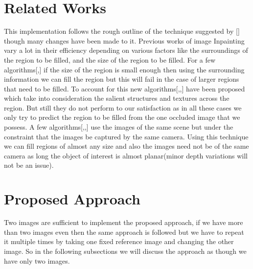 \documentclass[conference]{IEEEtran}
\begin{document}
\section{Related Works}	  
	This implementation follows the rough outline of the technique suggested by [\cite{whyte2009get}] though many changes have been made to it. Previous works of image Inpainting vary a lot in their efficiency depending on various factors like the surroundings of the region to be filled, and the size of the region to be filled. For a few algorithms[\cite{bertalmio2003simultaneous},\cite{efros1999texture}] if the size of the region is small enough then using the surrounding information we can fill the region but this will fail in the case of larger regions that need to be filled. To account for this new algorithms[\cite{bertalmio2003simultaneous},\cite{criminisi2003object},\cite{sun2005image}] have been proposed which take into consideration the salient structures and textures across the region. But still they do not perform to our satisfaction as in all these cases we only try to predict the region to be filled from the one occluded image that we possess. A few algorithms[\cite{agarwala2004interactive},\cite{rasmussen2005spatiotemporal},\cite{wilczkowiak2005hole}] use the images of the same scene but under the constraint that the images be captured by the same camera.
	Using this technique we can fill regions of almost any size and also the images need not be of the same camera as long the object of interest is almost planar(minor depth variations will not be an issue). 
\section{Proposed Approach}
	Two images are sufficient to implement the proposed approach, if we have more than two images even then the same approach is followed but we have to repeat it multiple times by taking one fixed reference image and changing the other image. So in the following subsections we will discuss the approach as though we have only two images.
\end{document}
